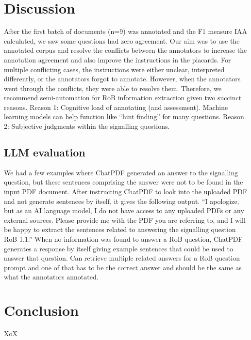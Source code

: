 \documentclass[sn-mathphys,Numbered]{sn-jnl}%
\theoremstyle{thmstyleone}%
\theoremstyle{thmstyletwo}%
\theoremstyle{thmstylethree}%
\begin{document}
\section{Discussion}
\label{sec:discussion}
%
After the first batch of documents (n=9) was annotated and the F1 measure IAA calculated, we saw some questions had zero agreement.
Our aim was to use the annotated corpus and resolve the conflicts between the annotators to increase the annotation agreement and also improve the instructions in the placards.
For multiple conflicting cases, the instructions were either unclear, interpreted differently, or the annotators forgot to annotate.
However, when the annotators went through the conflicts, they were able to resolve them.
Therefore, we recommend semi-automation for RoB information extraction given two succinct reasons.
Reason 1: Cognitive load of annotating (and assessment). Machine learning models can help function like ``hint finding'' for many questions.
Reason 2: Subjective judgments within the signalling questions.
~\cite{loef2022interrater}
%
%
%
\subsection{LLM evaluation}
\label{disc:llm}
%
We had a few examples where ChatPDF generated an answer to the signalling question, but these sentences comprising the answer were not to be found in the input PDF document.
After instructing ChatPDF to look into the uploaded PDF and not generate sentences by itself, it gives the following output.
``I apologize, but as an AI language model, I do not have access to any uploaded PDFs or any external sources. Please provide me with the PDF you are referring to, and I will be happy to extract the sentences related to answering the signalling question RoB 1.1.''
When no information was found to answer a RoB question, ChatPDF generates a response by itself giving example sentences that could be used to answer that question.
Can retrieve multiple related answers for a RoB question prompt and one of that has to be the correct answer and should be the same as what the annotators annotated.

%
%
%
\section{Conclusion}
\label{sec:conclusion}
%
XoX
%
%
%
\end{document}
